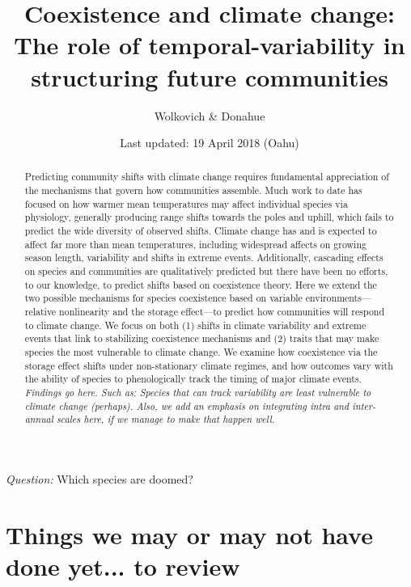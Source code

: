 \documentclass[11pt,a4paper,oneside]{article}
\begin{document}
\renewcommand{\labelitemi}{$-$}
\title{Coexistence and climate change: \\The role of
    temporal-variability in structuring future communities}
    \author{Wolkovich \& Donahue}
\date{Last updated: 19 April 2018 (Oahu) \\ } %
\maketitle 

\begin{center}
\emph{Question:} Which species are doomed?
\end{center}

\begin{abstract} Predicting community shifts
with climate change requires fundamental appreciation of the
mechanisms that govern how communities assemble. Much work to date has
focused on how warmer mean temperatures may affect individual species
via physiology, generally producing range shifts towards the poles and
uphill, which fails to predict the wide diversity of observed shifts.
Climate change has and is expected to affect far more than mean
temperatures, including widespread affects on growing season
length, variability and shifts in extreme events. Additionally,
cascading effects on species and communities are qualitatively
predicted but there have been no efforts, to our knowledge, to predict
shifts based on coexistence theory. Here we extend the two possible
mechanisms for species coexistence based on variable environments---
relative nonlinearity and the storage effect---to predict how
communities will respond to climate change. We focus on both (1) shifts in
climate variability and extreme events that link to
stabilizing coexistence mechanisms and (2) traits that may
make species the most vulnerable to climate change. We examine how
coexistence via the storage effect shifts under non-stationary climate regimes, and how outcomes vary with the
ability of species to phenologically track the timing of major climate events. \emph{Findings go here. Such as: Species that can track variability are least vulnerable to climate change (perhaps).  Also, we add an emphasis on integrating intra and inter-annual scales here, if we manage to make that happen well.}
\end{abstract}

\newpage
\tableofcontents

\newpage
\section{Things we may or may not have done yet... to review}
\end{document}

